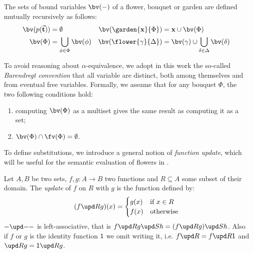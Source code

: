 \begin{scope}
\begin{definition}[Bound variables]
  The sets of bound variables $\bv(-)$ of a flower, bouquet or garden are
  defined mutually recursively as follows:
  \begin{align*}
    \bv(p(\tvec{t})) &= \emptyset &
    \bv(\garden{\bx}{\Phi}) &= \bx \cup \bv(\Phi) \\
    \bv(\Phi) &= \bigcup_{\phi \in \Phi}{\bv(\phi)} &
    \bv(\flower{\gamma}{\Delta}) &= \bv(\gamma) \cup \bigcup_{\delta \in \Delta}{\bv(\delta)}
  \end{align*}
\end{definition}

To avoid reasoning about $\alpha$-equivalence, we adopt in this work the
so-called \emph{Barendregt convention} that all variable  are distinct,
both among themselves and from eventual free variables. Formally, we assume that
for any bouquet $\Phi$, the two following conditions hold:
\begin{enumerate}
  \item computing $\bv(\Phi)$ as a multiset gives the same result as computing
  it as a set;
  \item $\bv(\Phi) \cap \fv(\Phi) = \emptyset$.
\end{enumerate} 

To define substitutions, we introduce a general notion of \emph{function
update}, which will be useful for the semantic evaluation of flowers in
.

\begin{definition}
  Let $A, B$ be two sets, $f, g : A \to B$ two functions and $R \subseteq A$
  some subset of their domain. The \emph{update} of $f$ on $R$ with $g$ is the
  function defined by:
  $$
  (\update{f}{R}{g})(x) =
  \begin{cases}
    g(x) &\text{if $x \in R$} \\
    f(x) &\text{otherwise}
  \end{cases}
  $$
  $\update{-}{-}{-}$ is left-associative, that is
  $\update{f}{R}{\update{g}{S}{h}} = \update{(\update{f}{R}{g})}{S}{h}$. Also
  if $f$ or $g$ is the identity function $\mathsf{1}$ we omit writing it, i.e.
  $\update{f}{R}{{}} = \update{f}{R}{\idsubst}$ and $\update{{}}{R}{g} =
  \update{\idsubst}{R}{g}$.
\end{definition}


\end{scope}
